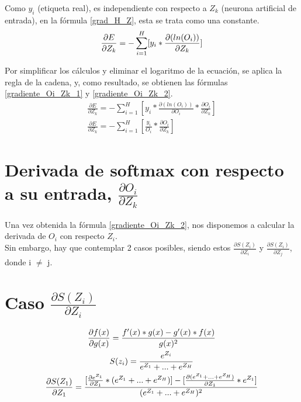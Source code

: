 Como $y_i$ (etiqueta real), es independiente con respecto a $Z_k$ (neurona artificial de entrada), en la fórmula \ref{grad_H_Z}, esta se trata como una constante. \\
\begin{gather}
	\frac{\partial E}{\partial Z_k} = - \sum_{i=1}^{H}  [y_i * \frac{\partial(ln(O_i))}{\partial Z_k}] \notag
\end{gather}

Por simplificar los cálculos y eliminar el logaritmo de la ecuación, se aplica la regla de la cadena, y, como resultado, se obtienen las fórmulas \ref{gradiente_Oi_Zk_1} y \ref{gradiente_Oi_Zk_2}.
\begin{gather}	
	\frac{\partial E}{\partial Z_k} = - \sum_{i=1}^{H}  [y_i * \frac{\partial(ln(O_i))}{\partial O_i} * \frac{\partial O_i}{\partial Z_k}]
	\label{gradiente_Oi_Zk_1} \\
	\frac{\partial E}{\partial Z_k} = - \sum_{i=1}^{H}  [\frac{y_i}{O_i} * \frac{\partial O_i}{\partial Z_k}] 
	\label{gradiente_Oi_Zk_2}
\end{gather}


\section{Derivada de softmax con respecto a su entrada, $\frac{\partial O_i}{\partial Z_k}$}

Una vez obtenida la fórmula \ref{gradiente_Oi_Zk_2}, nos disponemos a calcular la derivada de $O_i$ con respecto $Z_i$. \\
Sin embargo, hay que contemplar 2 casos posibles, siendo estos $\frac{\partial S(Z_i)}{\partial Z_i}$ y $\frac{\partial S(Z_i)}{\partial Z_j}$, donde i $\neq$ j. \\

\section{Caso $\frac{\partial S(Z_i)}{\partial Z_i}$}

\begin{gather}
	\frac{\partial f(x)}{\partial g(x)} = \frac{f'(x)*g(x) - g'(x)*f(x)}{g(x)^2} \\
	S(z_i) = \frac{e^{Z_i}}{e^{Z_1} + ... + e^{Z_H}} \notag \\
	\frac{\partial S(Z_1)}{\partial Z_1} = \frac{[\frac{\partial e^{Z_1}}{\partial Z_1} * (e^{Z_1} + ... + e^{Z_H}) ] - [\frac{\partial (e^{Z_1} + ... + e^{Z_H})}{\partial Z_1} * e^{Z_1} ] }{(e^{Z_1} + ... + e^{Z_H})^2} \notag
\end{gather}

